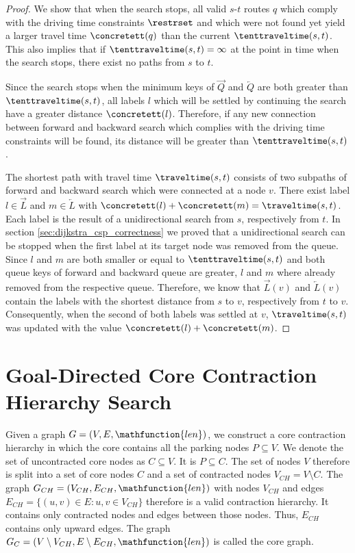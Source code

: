\begin{proof}
	We show that when the search stops, all valid $s$-$t$ routes $q$ which comply with the driving time constraints $\restrset$ and which were not found yet yield a larger travel time $\concretett(q)$ than the current $\tenttraveltime(s,t)$. This also implies that if $\tenttraveltime(s,t) = \infty$ at the point in time when the search stops, there exist no paths from $s$ to $t$.

	Since the search stops when the minimum keys of $\overrightarrow{Q}$ and $\overleftarrow{Q}$ are both greater than $\tenttraveltime(s,t)$, all labels $l$ which will be settled by continuing the search have a greater distance $\concretett(l)$. Therefore, if any new connection between forward and backward search which complies with the driving time constraints will be found, its distance will be greater than $\tenttraveltime(s,t)$.

	The shortest path with travel time $\traveltime(s,t)$ consists of two subpaths of forward and backward search which were connected at a node $v$. There exist label $l \in \overrightarrow{L}$ and $m \in \overleftarrow{L}$ with $\concretett(l) + \concretett(m) = \traveltime(s,t)$. Each label is the result of a unidirectional search from $s$, respectively from $t$. In section \ref{sec:dijkstra_csp_correctness} we proved that a unidirectional search can be stopped when the first label at its target node was removed from the queue. Since $l$ and $m$ are both smaller or equal to $\tenttraveltime(s,t)$ and both queue keys of forward and backward queue are greater, $l$ and $m$ where already removed from the respective queue. Therefore, we know that $\overrightarrow{L}(v)$ and $\overleftarrow{L}(v)$ contain the labels with the shortest distance from $s$ to $v$, respectively from $t$ to $v$. Consequently, when the second of both labels was settled at $v$, $\traveltime(s,t)$ was updated with the value $\concretett(l) + \concretett(m)$.
\end{proof}

\section{Goal-Directed Core Contraction Hierarchy Search}
Given a graph $G = (V,E,\mathfunction{len})$, we construct a core contraction hierarchy in which the core contains all the parking nodes $P \subseteq V$. We denote the set of uncontracted core nodes as $C \subseteq V$. It is $P \subseteq C$. The set of nodes $V$ therefore is split into a set of core nodes $C$ and a set of contracted nodes $V_{CH} = V \setminus C$. The graph $G_{CH} = (V_{CH},E_{CH},\mathfunction{len})$ with nodes $V_{CH}$ and edges $E_{CH} = \{(u,v) \in E \colon u,v \in V_{CH}\}$ therefore is a valid contraction hierarchy. It contains only contracted nodes and edges between those nodes. Thus, $E_{CH}$ contains only upward edges. The graph $G_{C} = (V \setminus V_{CH},E \setminus E_{CH},\mathfunction{len})$ is called the core graph.

